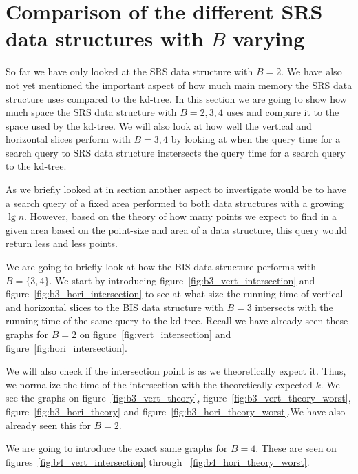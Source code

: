 \section{Comparison of the different SRS data structures with $B$ varying}

So far we have only looked at the SRS data structure with $B=2$. We have also not yet mentioned the important aspect of how much main memory the SRS data structure uses compared to the kd-tree. In this section we are going to show how much space the SRS data structure with $B={2,3,4}$ uses and compare it to the space used by the kd-tree. We will also look at how well the vertical and horizontal slices perform with $B={3,4}$ by looking at when the query time for a search query to SRS data structure instersects the query time for a search query to the kd-tree. 


As we briefly looked at in section another aspect to investigate would be to have a search query of a fixed area performed to both data structures with a growing $\lg n$. However, based on the theory of how many points we expect to find in a given area based on the point-size and area of a data structure, this query would return less and less points. 

We are going to briefly look at how the BIS data structure performs with $B=\{3,4\}$. We start by introducing figure~\ref{fig:b3_vert_intersection} and figure~\ref{fig:b3_hori_intersection} to see at what size the running time of vertical and horizontal slices to the BIS data structure with $B=3$ intersects with the running time of the same query to the kd-tree. Recall we have already seen these graphs for $B=2$ on figure~\ref{fig:vert_intersection} and figure~\ref{fig:hori_intersection}.

We will also check if the intersection point is as we theoretically expect it. Thus, we normalize the time of the intersection with the theoretically expected  $k$. We see the graphs on figure~\ref{fig:b3_vert_theory}, figure~\ref{fig:b3_vert_theory_worst},  figure~\ref{fig:b3_hori_theory} and figure~\ref{fig:b3_hori_theory_worst}.We have also already seen this for $B=2$. 

We are going to introduce the exact same graphs for $B=4$. These are seen on figures~\ref{fig:b4_vert_intersection} through ~\ref{fig:b4_hori_theory_worst}.


